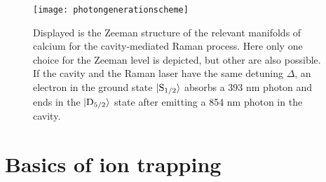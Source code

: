 \begin{figure}
     \centering
     \texttt{[image: photongenerationscheme]}
    \caption{Displayed is the Zeeman structure of the relevant manifolds of calcium for the cavity-mediated Raman process. Here only one choice for the Zeeman level is depicted, but other are also possible. If the cavity and the Raman laser have the same detuning $\Delta$, an electron in the ground state $\ket{\text{S}_{1/2}}$ absorbs a 393 nm photon and ends in the $\ket{\text{D}_{5/2}}$ state after emitting a 854 nm photon in the cavity.}
      \label{ramanprocess}
\end{figure}

\section{Basics of ion trapping}

